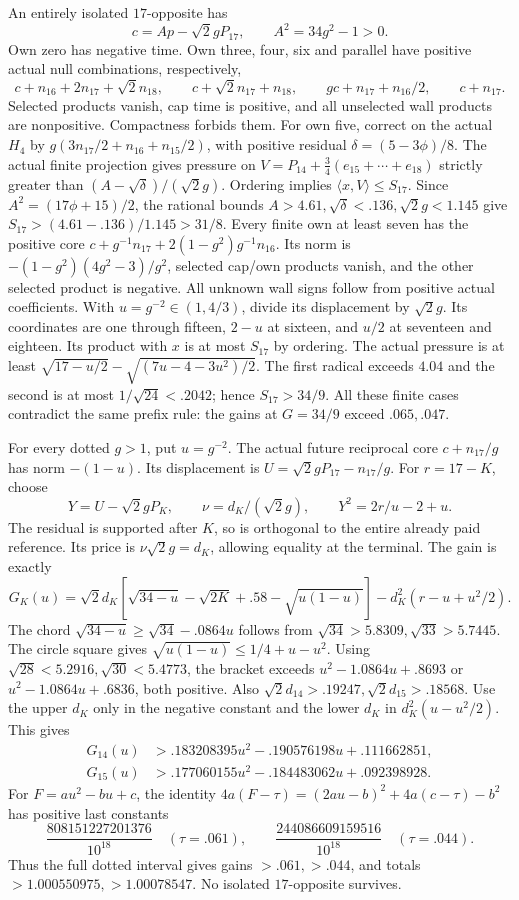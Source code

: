 \documentclass[11pt]{article}
\theoremstyle{definition}
\theoremstyle{remark}
\newcommand{\ip}[2]{\langle #1,#2\rangle}
\begin{document}
An entirely isolated \(17\)-opposite has
\[
 c=A p-\sqrt2gP_{17},\qquad A^2=34g^2-1>0.
\]
Own zero has negative time. Own three, four, six and parallel
have positive actual null combinations, respectively,
\[
 c+n_{16}+2n_{17}+\sqrt2n_{18},\qquad
 c+\sqrt2n_{17}+n_{18},\qquad
 g c+n_{17}+n_{16}/2,\qquad c+n_{17}.
\]
Selected products vanish, cap time is positive, and all
unselected wall products are nonpositive. Compactness forbids them.
For own five, correct on the actual \(H_4\) by
\(g(3n_{17}/2+n_{16}+n_{15}/2)\), with positive residual
\(\delta=(5-3\phi)/8\). The actual finite projection gives
pressure on \(V=P_{14}+\tfrac34(e_{15}+\cdots+e_{18})\)
strictly greater than \((A-\sqrt\delta)/(\sqrt2g)\).
Ordering implies \(\ip xV\leq S_{17}\).
Since \(A^2=(17\phi+15)/2\), the rational bounds
\(A>4.61,\sqrt\delta<.136,\sqrt2g<1.145\) give
\(S_{17}>(4.61-.136)/1.145>31/8\).
Every finite own at least seven has the positive core
\(c+g^{-1}n_{17}+2(1-g^2)g^{-1}n_{16}\).
Its norm is \(-(1-g^2)(4g^2-3)/g^2\), selected cap/own
products vanish, and the other selected product is negative.
All unknown wall signs follow from positive actual coefficients.
With \(u=g^{-2}\in(1,4/3)\), divide its displacement by
\(\sqrt2g\). Its coordinates are one through fifteen,
\(2-u\) at sixteen, and \(u/2\) at seventeen and eighteen.
Its product with \(x\) is at most \(S_{17}\) by ordering.
The actual pressure is at least
\(\sqrt{17-u/2}-\sqrt{(7u-4-3u^2)/2}\).
The first radical exceeds \(4.04\) and the second is at most
\(1/\sqrt{24}<.2042\); hence \(S_{17}>34/9\).
All these finite cases contradict the same prefix rule:
the gains at \(G=34/9\) exceed \(.065,.047\).

For every dotted \(g>1\), put \(u=g^{-2}\).
The actual future reciprocal core \(c+n_{17}/g\)
has norm \(-(1-u)\). Its displacement is
\(U=\sqrt2gP_{17}-n_{17}/g\).
For \(r=17-K\), choose
\[
 Y=U-\sqrt2gP_K,\qquad
 \nu=d_K/(\sqrt2g),\qquad
 Y^2=2r/u-2+u.
\]
The residual is supported after \(K\), so is orthogonal
to the entire already paid reference. Its price is
\(\nu\sqrt2g=d_K\), allowing equality at the terminal.
The gain is exactly
\[
 G_K(u)=\sqrt2d_K\!
 \left[\sqrt{34-u}-\sqrt{2K}+.58-\sqrt{u(1-u)}\right]
 -d_K^2(r-u+u^2/2).
\]
The chord \(\sqrt{34-u}\geq\sqrt{34}-.0864u\) follows from
\(\sqrt{34}>5.8309,\sqrt{33}>5.7445\).
The circle square gives
\(\sqrt{u(1-u)}\leq1/4+u-u^2\).
Using \(\sqrt{28}<5.2916,\sqrt{30}<5.4773\),
the bracket exceeds \(u^2-1.0864u+.8693\) or
\(u^2-1.0864u+.6836\), both positive.
Also \(\sqrt2d_{14}>.19247,\sqrt2d_{15}>.18568\).
Use the upper \(d_K\) only in the negative constant and
the lower \(d_K\) in \(d_K^2(u-u^2/2)\).
This gives
\[
\begin{split}
G_{14}(u)&>.183208395u^2-.190576198u+.111662851,\\
G_{15}(u)&>.177060155u^2-.184483062u+.092398928.
\end{split}
\]
For \(F=au^2-bu+c\), the identity
\(4a(F-\tau)=(2au-b)^2+4a(c-\tau)-b^2\)
has positive last constants
\[
 \frac{808151227201376}{10^{18}}\quad(\tau=.061),\qquad
 \frac{244086609159516}{10^{18}}\quad(\tau=.044).
\]
Thus the full dotted interval gives gains \(>.061,>.044\),
and totals \(>1.000550975,>1.00078547\).
No isolated \(17\)-opposite survives.
\end{document}
